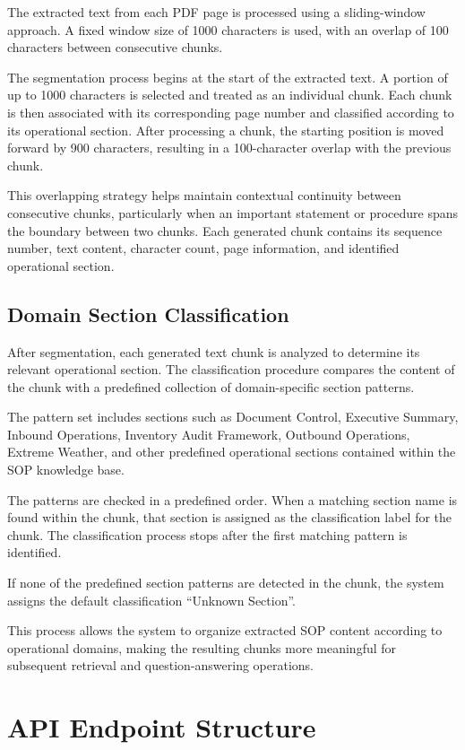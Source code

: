 The extracted text from each PDF page is processed using a sliding-window approach. A fixed window size of 1000 characters is used, with an overlap of 100 characters between consecutive chunks.

The segmentation process begins at the start of the extracted text. A portion of up to 1000 characters is selected and treated as an individual chunk. Each chunk is then associated with its corresponding page number and classified according to its operational section. After processing a chunk, the starting position is moved forward by 900 characters, resulting in a 100-character overlap with the previous chunk.

This overlapping strategy helps maintain contextual continuity between consecutive chunks, particularly when an important statement or procedure spans the boundary between two chunks. Each generated chunk contains its sequence number, text content, character count, page information, and identified operational section.

\subsection{Domain Section Classification}

After segmentation, each generated text chunk is analyzed to determine its relevant operational section. The classification procedure compares the content of the chunk with a predefined collection of domain-specific section patterns.

The pattern set includes sections such as Document Control, Executive Summary, Inbound Operations, Inventory Audit Framework, Outbound Operations, Extreme Weather, and other predefined operational sections contained within the SOP knowledge base.

The patterns are checked in a predefined order. When a matching section name is found within the chunk, that section is assigned as the classification label for the chunk. The classification process stops after the first matching pattern is identified.

If none of the predefined section patterns are detected in the chunk, the system assigns the default classification ``Unknown Section''.

This process allows the system to organize extracted SOP content according to operational domains, making the resulting chunks more meaningful for subsequent retrieval and question-answering operations.

\section{API Endpoint Structure}
\label{sec:design_api_endpoints}


